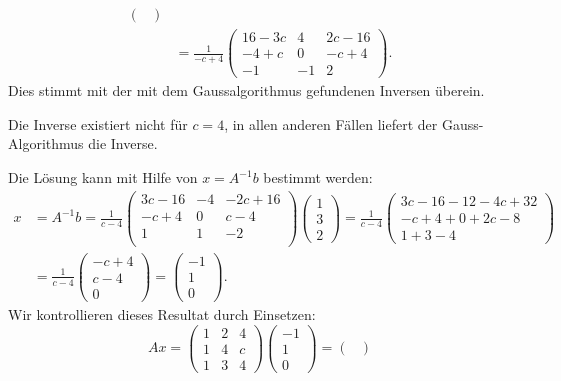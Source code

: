 \begin{loesung}
\begin{teilaufgaben}
\begin{align*}
\begin{pmatrix}
\end{pmatrix}
\\
&=
\frac1{-c+4}
\begin{pmatrix}
   16-3c&      4&  2c-16\\
    -4+c&      0&   -c+4\\
      -1&     -1&      2
\end{pmatrix}.
\end{align*}
Dies stimmt mit der mit dem Gaussalgorithmus gefundenen Inversen überein.
\item
Die Inverse existiert nicht für $c=4$, in allen anderen Fällen
liefert der Gauss-Algorithmus die Inverse.
\item
Die Lösung kann mit Hilfe von $x=A^{-1}b$ bestimmt werden:
\begin{align*}
x&=
A^{-1}b=
\frac{1}{c-4}
\begin{pmatrix}
3c-16&-4& -2c+16\\
-c+ 4& 0&   c- 4\\
    1& 1&    - 2\\
\end{pmatrix}
\begin{pmatrix}1\\3\\2\end{pmatrix}
=
\frac{1}{c-4}
\begin{pmatrix}
3c-16-12-4c+32\\
-c+4+0+2c-8\\
1+3-4
\end{pmatrix}
\\
&=
\frac{1}{c-4}
\begin{pmatrix}
-c+4\\
c-4\\
0
\end{pmatrix}
=\begin{pmatrix}
-1\\1\\0
\end{pmatrix}.
\end{align*}
Wir kontrollieren dieses Resultat durch Einsetzen:
\[
Ax=
\begin{pmatrix}
1&2&4\\
1&4&c\\
1&3&4
\end{pmatrix}
\begin{pmatrix}
-1\\1\\0
\end{pmatrix}
=
\begin{pmatrix}

\end{pmatrix}\]
\end{teilaufgaben}
\end{loesung}
